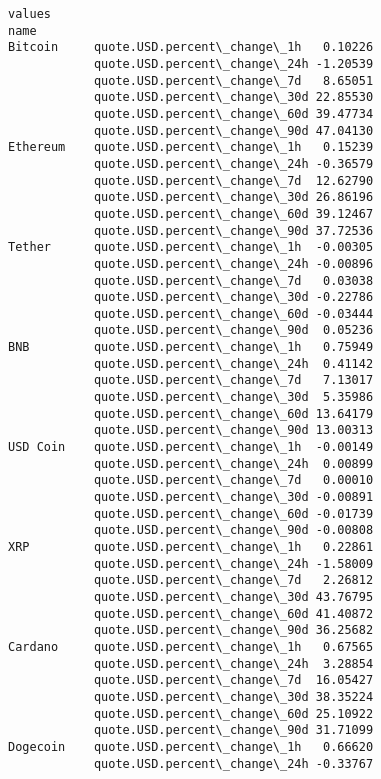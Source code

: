\documentclass[11pt]{article}
\makeatletter
\newcommand{\boxspacing}{\kern\kvtcb@left@rule\kern\kvtcb@boxsep}
\newcommand{\prompt}[4]{
        {\ttfamily\llap{{\color{#2}[#3]:\hspace{3pt}#4}}\vspace{-\baselineskip}}
    }
\makeatother
\begin{document}
            \begin{tcolorbox}[breakable, size=fbox, boxrule=.5pt, pad at break*=1mm, opacityfill=0]
\prompt{Out}{outcolor}{53}{\boxspacing}
\begin{Verbatim}[commandchars=\\\{\}]
                                           values
name
Bitcoin     quote.USD.percent\_change\_1h   0.10226
            quote.USD.percent\_change\_24h -1.20539
            quote.USD.percent\_change\_7d   8.65051
            quote.USD.percent\_change\_30d 22.85530
            quote.USD.percent\_change\_60d 39.47734
            quote.USD.percent\_change\_90d 47.04130
Ethereum    quote.USD.percent\_change\_1h   0.15239
            quote.USD.percent\_change\_24h -0.36579
            quote.USD.percent\_change\_7d  12.62790
            quote.USD.percent\_change\_30d 26.86196
            quote.USD.percent\_change\_60d 39.12467
            quote.USD.percent\_change\_90d 37.72536
Tether      quote.USD.percent\_change\_1h  -0.00305
            quote.USD.percent\_change\_24h -0.00896
            quote.USD.percent\_change\_7d   0.03038
            quote.USD.percent\_change\_30d -0.22786
            quote.USD.percent\_change\_60d -0.03444
            quote.USD.percent\_change\_90d  0.05236
BNB         quote.USD.percent\_change\_1h   0.75949
            quote.USD.percent\_change\_24h  0.41142
            quote.USD.percent\_change\_7d   7.13017
            quote.USD.percent\_change\_30d  5.35986
            quote.USD.percent\_change\_60d 13.64179
            quote.USD.percent\_change\_90d 13.00313
USD Coin    quote.USD.percent\_change\_1h  -0.00149
            quote.USD.percent\_change\_24h  0.00899
            quote.USD.percent\_change\_7d   0.00010
            quote.USD.percent\_change\_30d -0.00891
            quote.USD.percent\_change\_60d -0.01739
            quote.USD.percent\_change\_90d -0.00808
XRP         quote.USD.percent\_change\_1h   0.22861
            quote.USD.percent\_change\_24h -1.58009
            quote.USD.percent\_change\_7d   2.26812
            quote.USD.percent\_change\_30d 43.76795
            quote.USD.percent\_change\_60d 41.40872
            quote.USD.percent\_change\_90d 36.25682
Cardano     quote.USD.percent\_change\_1h   0.67565
            quote.USD.percent\_change\_24h  3.28854
            quote.USD.percent\_change\_7d  16.05427
            quote.USD.percent\_change\_30d 38.35224
            quote.USD.percent\_change\_60d 25.10922
            quote.USD.percent\_change\_90d 31.71099
Dogecoin    quote.USD.percent\_change\_1h   0.66620
            quote.USD.percent\_change\_24h -0.33767

\end{Verbatim}
\end{tcolorbox}
\end{document}
